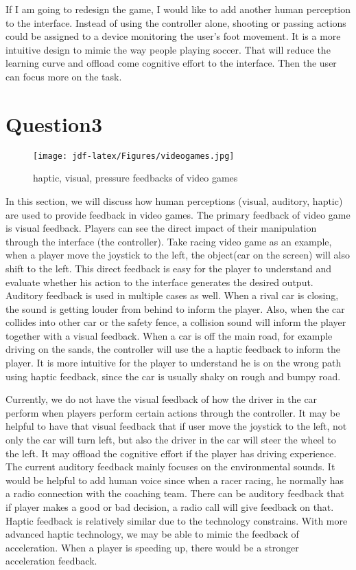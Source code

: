 \documentclass[
	letterpaper, %
]{jdf}
\begin{document}
If I am going to redesign the game, I would like to add another human perception to the interface. Instead of using the controller alone, shooting or passing actions could be assigned to a device monitoring the user's foot movement. It is a more intuitive design to mimic the way people playing soccer. That will reduce the learning curve and offload come cognitive effort to the interface. Then the user can focus more on the task.

\section{Question3}
\begin{figure}[h]
	\centering
	\texttt{[image: jdf-latex/Figures/videogames.jpg]}
	\caption{haptic, visual, pressure feedbacks of video games}
	\label{fig:videogames}
\end{figure}
In this section, we will discuss how human perceptions (visual, auditory, haptic) are used to provide feedback in video games. The primary feedback of video game is visual feedback. Players can see the direct impact of their manipulation through the interface (the controller). Take racing video game as an example, when a player move the joystick to the left, the object(car on the screen) will also shift to the left. This direct feedback is easy for the player to understand and evaluate whether his action to the interface generates the desired output. Auditory feedback is used in multiple cases as well. When a rival car is closing, the sound is getting louder from behind to inform the player. Also, when the car collides into other car or the safety fence, a collision sound will inform the player together with a visual feedback. When a car is off the main road, for example driving on the sands, the controller will use the a haptic feedback to inform the player. It is more intuitive for the player to understand he is on the wrong path using haptic feedback, since the car is usually shaky on rough and bumpy road.

Currently, we do not have the visual feedback of how the driver in the car perform when players perform certain actions through the controller. It may be helpful to have that visual feedback that if user move the joystick to the left, not only the car will turn left, but also the driver in the car will steer the wheel to the left. It may offload the cognitive effort if the player has driving experience. The current auditory feedback mainly focuses on the environmental sounds. It would be helpful to add human voice since when a racer racing, he normally has a radio connection with the coaching team. There can be auditory feedback that if player makes a good or bad decision, a radio call will give feedback on that. Haptic feedback is relatively similar due to the technology constrains. With more advanced haptic technology, we may be able to mimic the feedback of acceleration. When a player is speeding up, there would be a stronger acceleration feedback.
\end{document}
